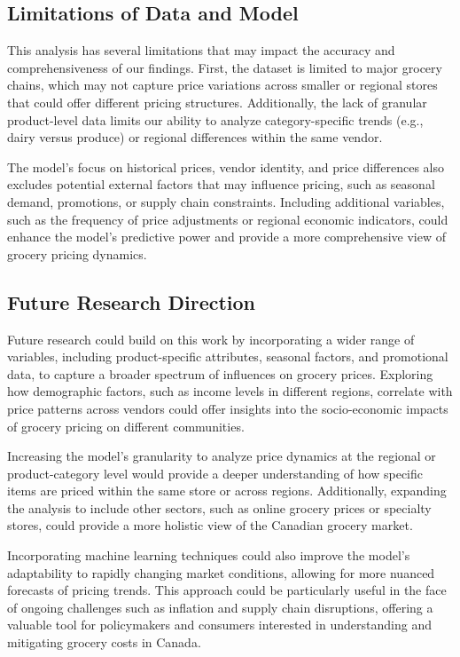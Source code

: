 \documentclass[
  letterpaper,
  DIV=11,
  numbers=noendperiod]{scrartcl}
\begin{document}
\subsection{Limitations of Data and
Model}\label{limitations-of-data-and-model}

This analysis has several limitations that may impact the accuracy and
comprehensiveness of our findings. First, the dataset is limited to
major grocery chains, which may not capture price variations across
smaller or regional stores that could offer different pricing
structures. Additionally, the lack of granular product-level data limits
our ability to analyze category-specific trends (e.g., dairy versus
produce) or regional differences within the same vendor.

The model's focus on historical prices, vendor identity, and price
differences also excludes potential external factors that may influence
pricing, such as seasonal demand, promotions, or supply chain
constraints. Including additional variables, such as the frequency of
price adjustments or regional economic indicators, could enhance the
model's predictive power and provide a more comprehensive view of
grocery pricing dynamics.

\subsection{Future Research Direction}\label{future-research-direction}

Future research could build on this work by incorporating a wider range
of variables, including product-specific attributes, seasonal factors,
and promotional data, to capture a broader spectrum of influences on
grocery prices. Exploring how demographic factors, such as income levels
in different regions, correlate with price patterns across vendors could
offer insights into the socio-economic impacts of grocery pricing on
different communities.

Increasing the model's granularity to analyze price dynamics at the
regional or product-category level would provide a deeper understanding
of how specific items are priced within the same store or across
regions. Additionally, expanding the analysis to include other sectors,
such as online grocery prices or specialty stores, could provide a more
holistic view of the Canadian grocery market.

Incorporating machine learning techniques could also improve the model's
adaptability to rapidly changing market conditions, allowing for more
nuanced forecasts of pricing trends. This approach could be particularly
useful in the face of ongoing challenges such as inflation and supply
chain disruptions, offering a valuable tool for policymakers and
consumers interested in understanding and mitigating grocery costs in
Canada.
\end{document}
